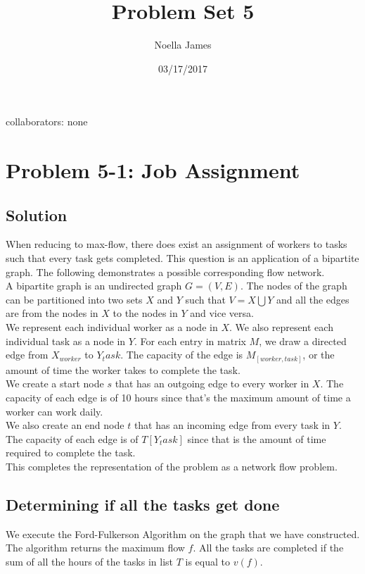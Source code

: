 \documentclass{article}
\theoremstyle{definition}
\theoremstyle{remark}
\theoremstyle{plain}
\begin{document}
\title{Problem Set 5}
\date{03/17/2017}
\author{Noella James}
\maketitle
collaborators: none\\

\section*{Problem 5-1: Job Assignment}

\subsection*{Solution}
When reducing to max-flow, there does exist an assignment of workers to tasks such that every task gets completed. This question is an application of a bipartite graph. The following demonstrates a possible corresponding flow network.\\
A bipartite graph is an undirected graph $G = (V,E)$. The nodes of the graph can be partitioned into two sets $X$ and $Y$ such that $V = X \bigcup Y$ and all the edges are from the nodes in $X$ to the nodes in $Y$ and vice versa.\\
We represent each individual worker as a node in $X$. We also represent each individual task as a node in $Y$. 
For each entry in matrix $M$, we draw a directed edge from $X_{worker}$ to $Y_task$. The capacity of the edge is $M_{[worker, task]}$, or the amount of time the worker takes to complete the task.\\
We create a start node $s$ that has an outgoing edge to every worker in $X$. The capacity of each edge is of 10 hours since that's the maximum amount of time a worker can work daily.\\
We also create an end node $t$ that has an incoming edge from every task in $Y$. The capacity of each edge is of $T[Y_task]$ since that is the amount of time required to complete the task.\\
This completes the representation of the problem as a network flow problem. 

\subsection*{Determining if all the tasks get done}
We execute the Ford-Fulkerson Algorithm on the graph that we have constructed. The algorithm returns the maximum flow $f$. All the tasks are completed if the sum of all the hours of the tasks in list $T$ is equal to $v(f)$. 
\end{document}
